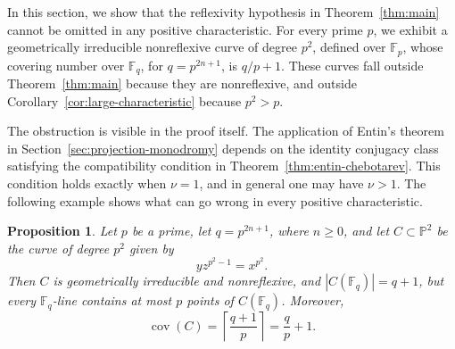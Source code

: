 \documentclass[10pt,a4paper]{amsart}
\newtheorem{proposition}[theorem]{Proposition}
\theoremstyle{definition}
\theoremstyle{remark}
\newcommand{\bF}{\mathbb{F}}
\newcommand{\Fp}{\mathbb{F}_p}
\newcommand{\Fq}{\mathbb{F}_q}
\newcommand{\bP}{\mathbb{P}}
\begin{document}
In this section, we show that the reflexivity hypothesis in
Theorem~\ref{thm:main} cannot be omitted in any positive characteristic. For every prime $p$, we exhibit a geometrically irreducible nonreflexive curve of degree $p^2$, defined over $\Fp$, whose covering number over $\bF_q$, for $q=p^{2n+1}$, is $q/p+1$. These curves fall outside Theorem~\ref{thm:main} because they are nonreflexive, and outside Corollary~\ref{cor:large-characteristic} because $p^2>p$.

The obstruction is visible in the proof itself. The application of Entin's theorem in Section~\ref{sec:projection-monodromy} depends on the identity conjugacy class satisfying the compatibility condition in Theorem~\ref{thm:entin-chebotarev}. This condition holds exactly when $\nu=1$, and in general one may have $\nu>1$. The following example shows what can go wrong in every positive characteristic.


\begin{proposition}\label{prop:nonreflexive-obstruction}
Let $p$ be a prime, let $q=p^{2n+1}$, where $n\geq 0$, and let
$C\subset\bP^2$ be the curve of degree $p^2$ given by
\[
yz^{p^2-1}=x^{p^2}.
\]
Then $C$ is geometrically irreducible and nonreflexive, and
$|C(\Fq)|=q+1$, but every $\Fq$-line contains at most $p$ points of
$C(\Fq)$. Moreover,
\[
\operatorname{cov}(C)
=
\left\lceil\frac{q+1}{p}\right\rceil
=
\frac{q}{p}+1.
\]
\end{proposition}
\end{document}
